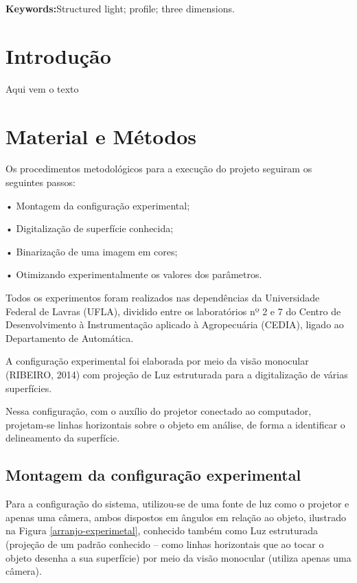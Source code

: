 \documentclass[a4paper, 12pt]{article}
\begin{document}
\textbf{Keywords:}Structured light; profile; three dimensions. 



\section{Introdução}

Aqui vem o texto



\section{Material e Métodos}

Os procedimentos metodológicos para a execução do projeto seguiram os seguintes passos:

• Montagem da configuração experimental;

• Digitalização de superfície conhecida;

• Binarização de uma imagem em cores;

• Otimizando experimentalmente os valores dos parâmetros. 

Todos os experimentos foram realizados nas dependências da Universidade Federal de Lavras (UFLA), dividido entre os laboratórios nº 2 e 7 do Centro de Desenvolvimento à Instrumentação aplicado à Agropecuária (CEDIA), ligado ao Departamento de Automática.

A configuração experimental foi elaborada por meio da visão monocular (RIBEIRO, 2014) com projeção de Luz estruturada para a digitalização de várias superfícies.

Nessa configuração, com o auxílio do projetor conectado ao computador, projetam-se linhas horizontais sobre o objeto em análise, de forma a identificar o delineamento da superfície.


\subsection{Montagem da configuração experimental}

Para a configuração do sistema, utilizou-se de uma fonte de luz como o projetor e apenas uma câmera, ambos dispostos em ângulos em relação ao objeto, ilustrado na Figura \ref{arranjo-experimetal}, conhecido também como Luz estruturada (projeção de um padrão conhecido – como linhas horizontais que ao tocar o objeto desenha a sua superfície) por meio da visão monocular (utiliza apenas uma câmera).
\end{document}
